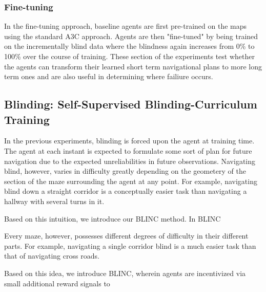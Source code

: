 \subsubsection{Fine-tuning}
In the fine-tuning approach, baseline agents are first pre-trained on the maps using the standard A3C approach. Agents are then "fine-tuned" by being trained on the incrementally blind data where the blindness  again increases from 0\% to 100\% over the course of training. These section of the experiments test whether the agents can transform their learned short term navigational plans to more long term ones and are also useful in determining where failiure occurs.

\subsection{Blinding: Self-Supervised Blinding-Curriculum Training}
In the previous experiments, blinding is forced upon the agent at training time. The agent at each instant is expected to formulate some sort of plan for future navigation due to the expected unreliabilities in future observations. Navigating blind, however, varies in difficulty greatly depending on the geometery of the section of the maze surrounding the agent at any point. For example, navigating blind down a straight corridor is a conceptually easier task than navigating a hallway with several turns in it. 

Based on this intuition, we introduce our BLINC method. In BLINC


Every maze, however, possesses different degrees of difficulty in their different parts. For example, navigating a single corridor blind is a much easier task than that of navigating cross roads.

Based on this idea, we introduce BLINC, wherein agents are incentivized via small additional reward signals to 
